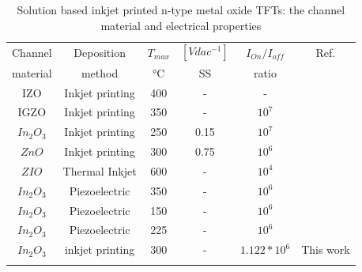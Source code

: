 \begin{table}[h]
\centering
\caption{Solution based inkjet printed n-type metal oxide TFTs: the channel material and electrical properties}
\begin{tabular}{|c|c|c|c|c|c|}
\hline 
\label{tab:3}
Channel 
&
Deposition 
&
 $ T_{max} $
&

{$\left[V dac^{-1}\right]$}
&
$I_{On}/I_{off} $
 & 
 Ref. 
 \\
material&method &°C&SS&ratio &\\
 \hline   IZO & Inkjet printing & 400  & - &-&~\cite{ref21} \\
 
\hline   IGZO & Inkjet printing & 350  & - &$10^7$&~\cite{ref20}  \\


\hline  $In_2O_3$ & Inkjet printing & 250 & 0.15 &$10^7$ & ~\cite{ref18} \\

\hline  $ZnO$ & Inkjet printing & 300  &0.75& $10^6$ & ~\cite{ref19}  \\

\hline  $ZIO$ & Thermal Inkjet  & 600  &-& $10^4$ &~\cite{ref22}  \\

\hline  $In_2O_3$ &  Piezoelectric   & 350  &-& $10^6$ & ~\cite{ref23}  \\

\hline
$In_2O_3$ &  Piezoelectric   & 150  &-& $10^6$ &~\cite{ref24}  \\

\hline
$In_2O_3$ &  Piezoelectric   & 225  &-& $10^6$ &~\cite{ref25}  \\

\hline
$In_2O_3$ &  inkjet printing& 300  &-& $1.122 * 10^6$ & This work \\

\hline
\label{tab:3}
\end{tabular}
\end{table}



